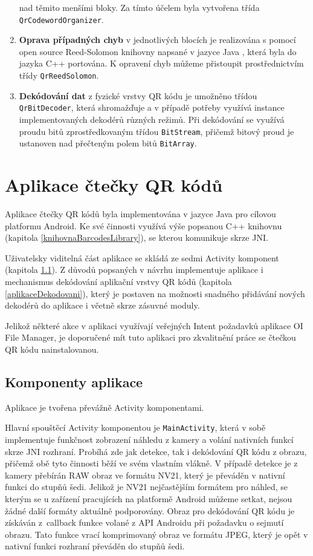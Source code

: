 \begin{enumerate}
  nad těmito menšími bloky. Za tímto účelem byla vytvořena třída
  \texttt{QrCodewordOrganizer}.
  \item \textbf{Oprava případných chyb} v jednotlivých blocích je realizována s
  pomocí open source Reed-Solomon knihovny napsané v jazyce Java
  \cite{reedSolomonProject}, která byla do jazyka C++ portována. K opravení chyb můžeme přistoupit prostřednictvím
  třídy \texttt{QrReedSolomon}.
  \item \textbf{Dekódování dat} z fyzické vrstvy QR kódu je umožněno třídou
  \texttt{QrBitDecoder}, která shromažďuje a v případě potřeby využívá instance
  implementovaných dekodérů různých režimů. Při dekódování se využívá proudu
  bitů zprostředkovaným třídou \texttt{BitStream}, přičemž bitový proud je
  ustanoven nad přečteným polem bitů \texttt{BitArray}.
\end{enumerate}

\clearpage
\section{Aplikace čtečky QR kódů}

Aplikace čtečky QR kódů byla implementována v jazyce Java pro cílovou platformu
Android. Ke své činnosti využívá výše popsanou C++ knihovnu (kapitola
\ref{knihovnaBarcodesLibrary}), se kterou komunikuje skrze JNI.

Uživatelsky viditelná část aplikace se skládá ze sedmi Activity komponent
(kapitola \ref{aplikaceComponents}). Z důvodů popsaných v návrhu implementuje
aplikace i mechanismus dekódování aplikační vrstvy QR kódů (kapitola
\ref{aplikaceDekodovani}), který je postaven na možnosti snadného přidávání
nových dekodérů do aplikace i včetně skrze zásuvné moduly.

Jelikož některé akce v aplikaci využívají veřejných Intent požadavků aplikace
OI File Manager, je doporučené mít tuto aplikaci pro zkvalitnění práce se
čtečkou QR kódu nainstalovanou.

\subsection{Komponenty aplikace}
\label{aplikaceComponents}

Aplikace je tvořena převážně Activity komponentami.

Hlavní spouštěcí Activity komponentou je \texttt{MainActivity}, která v sobě
implementuje funkčnost zobrazení náhledu z kamery a volání nativních funkcí skrze JNI
rozhraní. Probíhá zde jak detekce, tak i dekódování QR kódu z obrazu, přičemž
obě tyto činnosti běží ve svém vlastním vlákně. V případě detekce je z kamery
přebírán RAW obraz ve formátu NV21, který je převáděn v nativní funkci do
stupňů šedi. Jelikož je NV21 nejčastějším formátem pro náhled, se kterým se
u zařízení pracujících na platformě Android můžeme setkat, nejsou žádné další
formáty aktuálně podporovány. Obraz pro dekódování QR kódu je získáván
z~callback funkce volané z API Androidu při požadavku o sejmutí obrazu. Tato funkce vrací komprimovaný obraz ve formátu JPEG, který je opět v nativní
funkci rozhraní převáděn do stupňů šedi.

